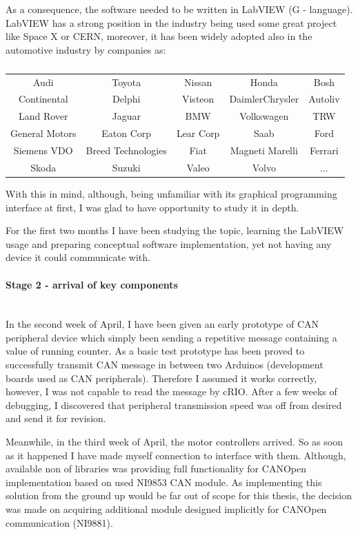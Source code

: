 As a consequence, the software needed to be written in LabVIEW (G - language). LabVIEW has a strong position in the industry being used some great project like Space X or CERN, moreover, it has been widely adopted also in the automotive industry by companies as:
\begin{table}[H]
    \centering
    \begin{tabular}{c|c|c|c|c}
        Audi & Toyota & Nissan & Honda & Bosh \\ 
        Continental & Delphi & Visteon & DaimlerChrysler & Autoliv \\
        Land Rover & Jaguar & BMW & Volkswagen & TRW \\
        General Motors & Eaton Corp & Lear Corp & Saab & Ford \\
        Siemens VDO & Breed Technologies & Fiat & Magneti Marelli & Ferrari \\
        Skoda & Suzuki & Valeo & Volvo & ...
    \end{tabular}
    \caption*{\cite{LabVIEW_adoption}}
    \label{tab:LabVIEW_adoption}
\end{table}
With this in mind, although, being unfamiliar with its graphical programming interface at first, I was glad to have opportunity to study it in depth.

For the first two months I have been studying the topic, learning the LabVIEW usage and preparing conceptual software implementation, yet not having any device it could communicate with.

\paragraph{Stage 2 - arrival of key components}   
\addtocounter{section}{1}
\mbox{}\\
In the second week of April, I have been given an early prototype of CAN peripheral device which simply been sending a repetitive message containing a value of running counter. As a basic test prototype has been proved to successfully transmit CAN message in between two Arduinos (development boards used as CAN peripherals). Therefore I assumed it works correctly, however, I was not capable to read the message by cRIO. After a few weeks of debugging, I discovered that peripheral transmission speed was off from desired and send it for revision.

Meanwhile, in the third week of April, the motor controllers arrived. So as soon as it happened I have made myself connection to interface with them. Although, available non of libraries was providing full functionality for CANOpen implementation based on used NI9853 CAN module. As implementing this solution from the ground up would be far out of scope for this thesis, the decision was made on acquiring additional module designed implicitly for CANOpen communication (NI9881).

